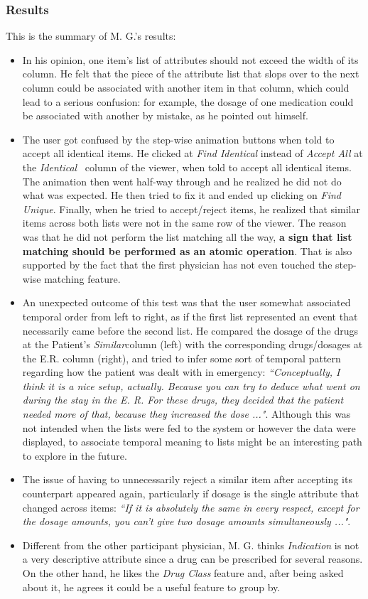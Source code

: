 \documentclass{chi2009}
\newcommand{\Similar}{\textit{Similar}}
\newcommand{\Identical}{\textit{Identical}}
\begin{document}
\subsubsection{Results}
This is the summary of M. G.'s results:
\begin{itemize}
\item In his opinion, one item's list of attributes should not exceed the width of its column. He felt that the piece of the attribute list that slops over to the next column could be associated with another item in that column, which could lead to a serious confusion: for example, the dosage of one medication could be associated with another by mistake, as he pointed out himself. 
\item The user got confused by the step-wise animation buttons when told to accept all identical items. He clicked at \textit{Find Identical} instead of \textit{Accept All} at the \Identical~ column of the viewer, when told to accept all identical items. The animation then went half-way through and he realized he did not do what was expected. He then tried to fix it and ended up clicking on \textit{Find Unique}. Finally, when he tried to accept/reject items, he realized that similar items across both lists were not in the same row of the viewer. The reason was that he did not perform the list matching all the way, \textbf{a sign that list matching should be performed as an atomic operation}. That is also supported by the fact that the first physician has not even touched the step-wise matching feature.
\item An unexpected outcome of this test was that the user somewhat associated temporal order from left to right, as if the first list represented an event that necessarily came before the second list. He compared the dosage of the drugs at the Patient's \Similar column (left) with the corresponding drugs/dosages at the E.R. column (right), and tried to infer some sort of temporal pattern regarding how the patient was dealt with in emergency: \textit{``Conceptually, I think it is a nice setup, actually. Because you can try to deduce what went on during the stay in the E. R. For these drugs, they decided that the patient needed more of that, because they increased the dose ..."}. Although this was not intended when the lists were fed to the system or however the data were displayed, to associate temporal meaning to lists might be an interesting path to explore in the future.
\item The issue of having to unnecessarily reject a similar item after accepting its counterpart appeared again, particularly if dosage is the single attribute that changed across items: \textit{``If it is absolutely the same in every respect, except for the dosage amounts, you can't give two dosage amounts simultaneously ..."}.
\item Different from the other participant physician, M. G.  thinks \textit{Indication} is not a very descriptive attribute since a drug can be prescribed for several reasons. On the other hand, he likes the \textit{Drug Class} feature and, after being asked about it, he agrees it could be a useful feature to group by.
\end{itemize}
\end{document}
